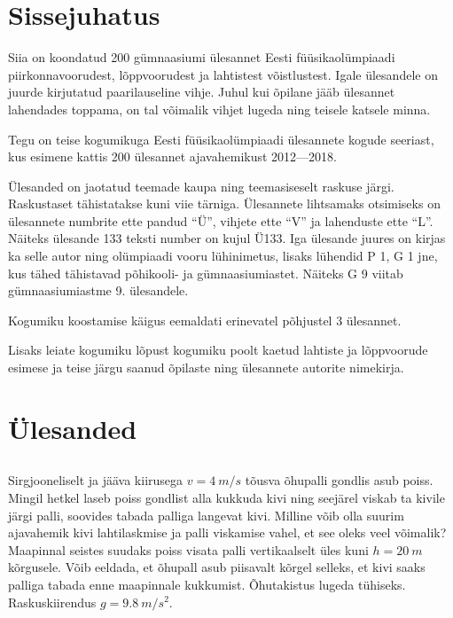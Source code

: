 \documentclass[10pt, twoside]{article}
\begin{document}
{\setlength{\parindent}{24pt}
\section{Sissejuhatus}

Siia on koondatud 200 gümnaasiumi ülesannet Eesti füüsikaolümpiaadi piirkonnavoorudest, lõppvoorudest ja lahtistest võistlustest. Igale ülesandele on juurde kirjutatud paarilauseline vihje. Juhul kui õpilane jääb ülesannet lahendades toppama, on tal võimalik vihjet lugeda ning teisele katsele minna.

Tegu on teise kogumikuga Eesti füüsikaolümpiaadi ülesannete kogude seeriast, kus esimene kattis 200 ülesannet ajavahemikust 2012---2018.

Ülesanded on jaotatud teemade kaupa ning teemasiseselt raskuse järgi. Raskustaset tähistatakse kuni viie tärniga. Ülesannete lihtsamaks otsimiseks on ülesannete numbrite ette pandud \enquote{Ü}, vihjete ette \enquote{V} ja lahenduste ette \enquote{L}. Näiteks ülesande 133 teksti number on kujul Ü133. Iga ülesande juures on kirjas ka selle autor ning olümpiaadi vooru lühinimetus, lisaks lühendid P 1, G 1 jne, kus tähed tähistavad põhikooli- ja gümnaasiumiastet. Näiteks G 9 viitab gümnaasiumiastme 9. ülesandele.

Kogumiku koostamise käigus eemaldati erinevatel põhjustel 3 ülesannet.

Lisaks leiate kogumiku lõpust kogumiku poolt kaetud lahtiste ja lõppvoorude esimese ja teise järgu saanud õpilaste ning ülesannete autorite nimekirja.
\newpage
\setlength{\parindent}{0pt}

        \section{Ülesanded}
        \toggleStatement
        \subsection{\protect{}}

\graphicspath{{../problems/}}


Sirgjooneliselt ja jääva kiirusega $v = \SI{4}{m/s}$ tõusva õhupalli gondlis asub poiss. Mingil hetkel laseb poiss gondlist alla kukkuda kivi ning seejärel viskab ta kivile järgi palli, soovides tabada palliga langevat kivi. Milline võib olla suurim ajavahemik kivi lahtilaskmise ja palli viskamise vahel, et see oleks veel võimalik? Maapinnal seistes suudaks poiss visata palli vertikaalselt üles kuni $h = \SI{20}{m}$ kõrgusele. Võib eeldada, et õhupall asub piisavalt kõrgel selleks, et kivi saaks palliga tabada enne maapinnale kukkumist. Õhutakistus lugeda tühiseks. Raskuskiirendus $g = \SI{9,8}{m/s^2}$.
\probend
\bigskip

}
\end{document}
